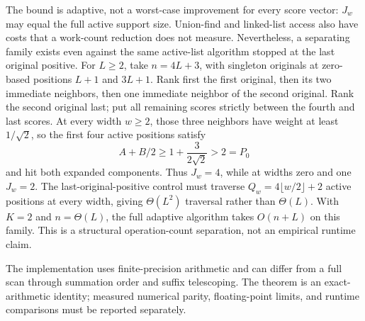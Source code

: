 The bound is adaptive, not a worst-case improvement for every score vector:
$J_w$ may equal the full active support size. Union-find and linked-list
access also have costs that a work-count reduction does not measure.
Nevertheless, a separating family exists even against the same active-list
algorithm stopped at the last original positive. For $L\ge2$, take
$n=4L+3$, with singleton originals at zero-based positions $L+1$ and $3L+1$.
Rank first the first original, then its two immediate neighbors, then one
immediate neighbor of the second original. Rank the second original last;
put all remaining scores strictly between the fourth and last scores.
At every width $w\ge2$, those three neighbors have weight at least
$1/\sqrt2$, so the first four active positions satisfy
\[
 A+B/2\ge 1+\frac{3}{2\sqrt2}>2=P_0
\]
and hit both expanded components. Thus $J_w=4$, while at widths zero and
one $J_w=2$. The last-original-positive control must traverse
$Q_w=4\lfloor w/2\rfloor+2$ active positions at every width, giving
$\Theta(L^2)$ traversal rather than $\Theta(L)$. With $K=2$ and $n=\Theta(L)$,
the full adaptive algorithm takes $O(n+L)$ on this family. This is a
structural operation-count separation, not an empirical runtime claim.

The implementation uses finite-precision arithmetic and can differ from a
full scan through summation order and suffix telescoping. The theorem is an
exact-arithmetic identity; measured numerical parity, floating-point limits,
and runtime comparisons must be reported separately.
